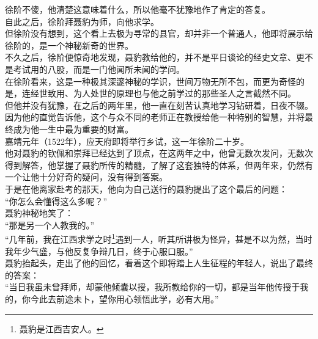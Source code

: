\begin{multicols}{\theparacolNo}
徐阶不傻，他清楚这意味着什么，所以他毫不犹豫地作了肯定的答复。\\

自此之后，徐阶拜聂豹为师，向他求学。\\

但徐阶没有想到，这个看上去极为寻常的县官，却并非一个普通人，他即将展示给徐阶的，是一个神秘新奇的世界。\\

不久之后，徐阶便惊奇地发现，聂豹教给他的，并不是平日谈论的经史文章、更不是考试用的八股，而是一门他闻所未闻的学问。\\

在徐阶看来，这是一种极其深邃神秘的学识，世间万物无所不包，而更为奇怪的是，连经世致用、为人处世的原理也与他之前学过的那些圣人之言截然不同。\\

但他并没有犹豫，在之后的两年里，他一直在刻苦认真地学习钻研着，日夜不辍。因为他的直觉告诉他，这个与众不同的老师正在教授给他一种特别的智慧，并将最终成为他一生中最为重要的财富。\\

嘉靖元年（1522年），应天府即将举行乡试，这一年徐阶二十岁。\\

他对聂豹的钦佩和崇拜已经达到了顶点，在这两年之中，他曾无数次发问，无数次得到解答，他掌握了聂豹所传的精髓，了解了这套独特的体系，但两年来，仍然有一个让他十分好奇的疑问，没有得到答案。\\

于是在他离家赴考的那天，他向为自己送行的聂豹提出了这个最后的问题：\\

“你怎么会懂得这么多呢？”\\

聂豹神秘地笑了：\\

“那是另一个人教我的。”\\

“几年前，我在江西求学之时\footnote{聂豹是江西吉安人。}遇到一人，听其所讲极为怪异，甚是不以为然，当时我年少气盛，与他反复争辩几日，终于心服口服。”\\

聂豹抬起头，走出了他的回忆，看着这个即将踏上人生征程的年轻人，说出了最终的答案：\\

“当日我虽未曾拜师，却蒙他倾囊以授，我所教给你的一切，都是当年他传授于我的，你今此去前途未卜，望你用心领悟此学，必有大用。”\\


\end{multicols}
